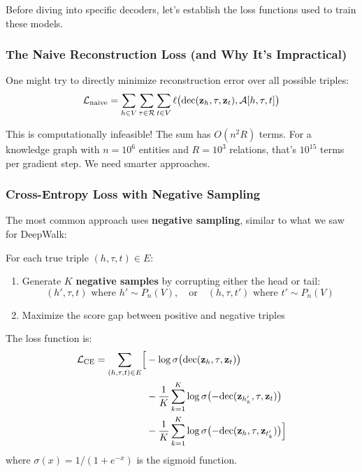 \begin{notechapter}
Before diving into specific decoders, let's establish the loss functions used to train these models.

\subsubsection*{The Naive Reconstruction Loss (and Why It's Impractical)}

One might try to directly minimize reconstruction error over all possible triples:
\[
\mathcal{L}_{\text{naive}} = \sum_{h \in V} \sum_{\tau \in \mathcal{R}} \sum_{t \in V} \ell\bigl(\text{dec}(\mathbf{z}_h, \tau, \mathbf{z}_t), \mathcal{A}[h, \tau, t]\bigr)
\]

\begin{whybox}
This is computationally infeasible! The sum has $O(n^2 R)$ terms. For a knowledge graph with $n = 10^6$ entities and $R = 10^3$ relations, that's $10^{15}$ terms per gradient step. We need smarter approaches.
\end{whybox}

\subsubsection*{Cross-Entropy Loss with Negative Sampling}

The most common approach uses \textbf{negative sampling}, similar to what we saw for DeepWalk:

\begin{definition}
For each true triple $(h, \tau, t) \in E$:
\begin{enumerate}
    \item Generate $K$ \textbf{negative samples} by corrupting either the head or tail:
    \[
    (h', \tau, t) \text{ where } h' \sim P_n(V), \quad \text{or} \quad (h, \tau, t') \text{ where } t' \sim P_n(V)
    \]
    \item Maximize the score gap between positive and negative triples
\end{enumerate}

The loss function is:
\begin{align}
\mathcal{L}_{\text{CE}} = \sum_{(h,\tau,t) \in E} \Bigl[ 
&-\log \sigma\bigl(\text{dec}(\mathbf{z}_h, \tau, \mathbf{z}_t)\bigr) \nonumber \\
&- \frac{1}{K}\sum_{k=1}^{K} \log \sigma\bigl(-\text{dec}(\mathbf{z}_{h_k'}, \tau, \mathbf{z}_t)\bigr) \nonumber \\
&- \frac{1}{K}\sum_{k=1}^{K} \log \sigma\bigl(-\text{dec}(\mathbf{z}_h, \tau, \mathbf{z}_{t_k'})\bigr)
\Bigr]
\end{align}
where $\sigma(x) = 1/(1+e^{-x})$ is the sigmoid function.
\end{definition}


\end{notechapter}
